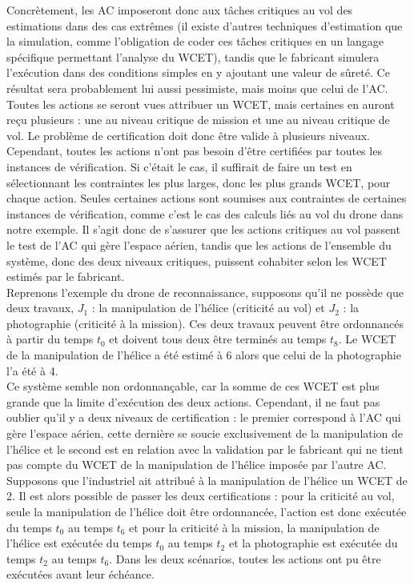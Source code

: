 \documentclass[11pt,a4paper,oneside]{book}
\theoremstyle{break}
\theoremstyle{breakplain}
\begin{document}
Concrètement, les AC imposeront donc aux tâches critiques au vol des estimations dans des cas extrêmes (il existe d'autres techniques d'estimation que la simulation, comme l'obligation de coder ces tâches critiques en un langage spécifique permettant l'analyse du WCET), tandis que le fabricant simulera l'exécution dans des conditions simples en y ajoutant une valeur de sûreté. Ce résultat sera probablement lui aussi pessimiste, mais moins que celui de l'AC.\\

Toutes les actions se seront vues attribuer un WCET, mais certaines en auront reçu plusieurs : une au niveau critique de mission et une au niveau critique de vol. Le problème de certification doit donc être valide à plusieurs niveaux. Cependant, toutes les actions n'ont pas besoin d'être certifiées par toutes les instances de vérification. Si c'était le cas, il suffirait de faire un test en sélectionnant les contraintes les plus larges, donc les plus grands WCET, pour chaque action. Seules certaines actions sont soumises aux contraintes de certaines instances de vérification, comme c'est le cas des calculs liés au vol du drone dans notre exemple. Il s'agit donc de s'assurer que les actions critiques au vol passent le test de l'AC qui gère l'espace aérien, tandis que les actions de l'ensemble du système, donc des deux niveaux critiques, puissent cohabiter selon les WCET estimés par le fabricant.\\

Reprenons l'exemple du drone de reconnaissance, supposons qu'il ne possède que deux travaux, $J_1$ : la manipulation de l'hélice (criticité au vol) et  $J_2$ : la photographie (criticité à la mission). Ces deux travaux peuvent être ordonnancés à partir du temps $t_0$ et doivent tous deux être terminés au temps $t_8$. Le WCET de la manipulation de l'hélice a été estimé à 6 alors que celui de la photographie l'a été à 4.\\

Ce système semble non ordonnançable, car la somme de ces WCET est plus grande que la limite d'exécution des deux actions. Cependant, il ne faut pas oublier qu'il y a deux niveaux de certification : le premier correspond à l'AC qui gère l'espace aérien, cette dernière se soucie exclusivement de la manipulation de l'hélice et le second est en relation avec la validation par le fabricant qui ne tient pas compte du WCET de la manipulation de l'hélice imposée par l'autre AC.\\
Supposons que l'industriel ait attribué à la manipulation de l'hélice un WCET de 2. Il est alors possible de passer les deux certifications : pour la criticité au vol, seule la manipulation de l'hélice doit être ordonnancée, l'action est donc exécutée du temps $t_0$ au temps $t_6$ et pour la criticité à la mission, la manipulation de l'hélice est exécutée du temps $t_0$ au temps $t_2$ et la photographie est exécutée du temps $t_2$ au temps $t_6$. Dans les deux scénarios, toutes les actions ont pu être exécutées avant leur échéance.\\
\end{document}
